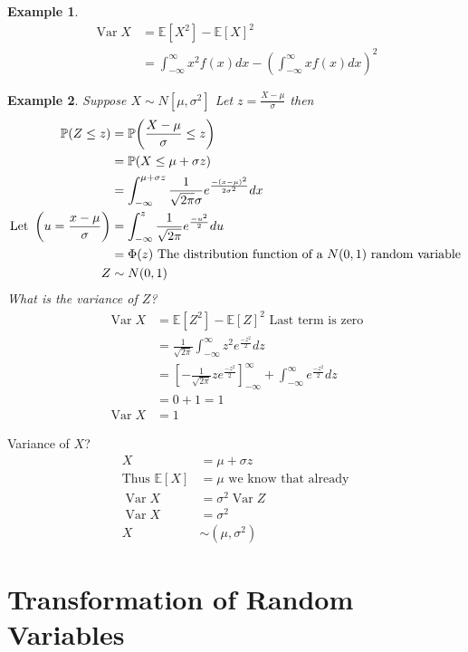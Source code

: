 \documentclass{notes}
\theoremstyle{plain}
\newtheorem*{example}{Example}
\newcommand{\bP}{\mathbb{P}}
\newcommand{\bE}{\mathbb{E}}
\newcommand{\prob}[1]{\bP \negthinspace\left(#1\right)}
\newcommand{\expect}[1]{\bE\!\left[#1\right]}
\DeclareMathOperator{\var}{Var}
\begin{document}
\begin{example}
\begin{align*}
\var{X} &= \expect{X^2} - \expect{X}^2\\
&= \int_{-\infty}^{\infty} x^2f(x)dx -
\left(\int_{-\infty}^{\infty} xf(x)dx\right)^2
\end{align*}
\end{example}

\begin{example}
Suppose $ X \sim N[\mu,\sigma^2]$ Let $z=\frac{X-\mu}{\sigma}$ then
\begin{align*}
\prob{Z\le z} &= \prob{\frac{X-\mu}{\sigma} \le z}\\
&= \prob{X \le \mu + \sigma z}\\
&= \int_{-\infty}^{\mu + \sigma z} 
\frac{1}{\sqrt{2\pi}\sigma}e^\frac{-(x-\mu)^2}{2\sigma^2} dx\\
\text{Let } \left(u=\frac{x-\mu}{\sigma}\right) &= \int_{-\infty}^z 
\frac{1}{\sqrt{2\pi}}e^\frac{-u^2}{2}du\\
&=\Phi(z) \text{ The distribution function of a $N(0,1)$ random
  variable}\\
Z &\sim N(0,1)
\end{align*}
What is the variance of $Z$?
\begin{align*}
\var{X} &= \expect{Z^2} - \expect{Z}^2 \text{ Last term is zero}\\
&=\frac{1}{\sqrt{2\pi}} \int_{-\infty}^{\infty}z^2 e^\frac{-z^2}{2}dz\\
&=\left[-\frac{1}{\sqrt{2\pi}}ze^\frac{-z^2}{2}\right]_{-\infty}^{\infty}
+ \int_{-\infty}^{\infty} e^\frac{-z^2}{2}dz\\
&= 0+1 =1\\
\var{X} &= 1
\end{align*}
\end{example}

Variance of $X$?
\begin{align*}
X&= \mu + \sigma z\\
\text{Thus } \expect{X} &= \mu \text{ we know that already}\\
\var{X} &= \sigma^2 \var{Z}\\
\var{X} &= \sigma^2\\
X&\sim (\mu,\sigma^2)
\end{align*} 

\section{Transformation of Random Variables}
\end{document}

